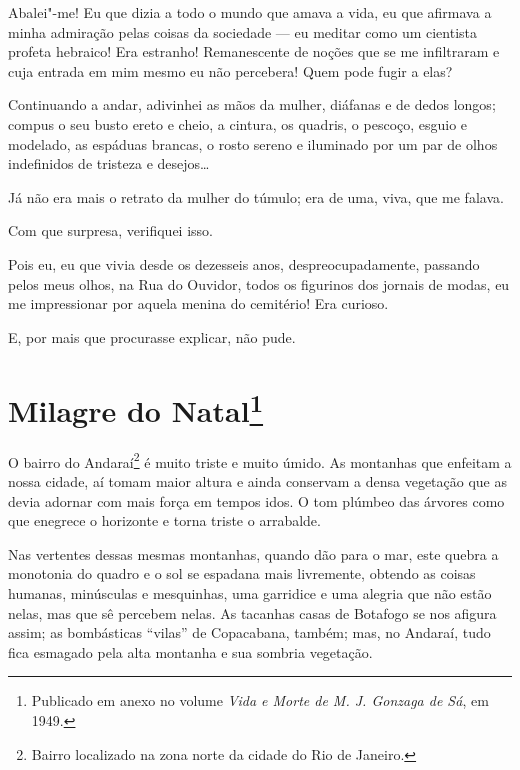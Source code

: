 Abalei"-me! Eu que dizia a todo o mundo que amava a vida, eu que afirmava
a minha admiração pelas coisas da sociedade --- eu meditar como um
cientista profeta hebraico! Era estranho! Remanescente de noções que se
me infiltraram e cuja entrada em mim mesmo eu não percebera! Quem pode
fugir a elas?

Continuando a andar, adivinhei as mãos da mulher, diáfanas e de dedos
longos; compus o seu busto ereto e cheio, a cintura, os quadris, o
pescoço, esguio e modelado, as espáduas brancas, o rosto sereno e
iluminado por um par de olhos indefinidos de tristeza e desejos\ldots{}

Já não era mais o retrato da mulher do túmulo; era de uma, viva, que me
falava.

Com que surpresa, verifiquei isso.

Pois eu, eu que vivia desde os dezesseis anos, despreocupadamente,
passando pelos meus olhos, na Rua do Ouvidor, todos os figurinos dos
jornais de modas, eu me impressionar por aquela menina do cemitério! Era
curioso.

E, por mais que procurasse explicar, não pude.



\chapter[Milagre do Natal]{Milagre do Natal\footnote[*]{Publicado em anexo no volume \emph{Vida e Morte de M. J. Gonzaga de Sá}, em 1949.}}

O bairro do Andaraí\footnote{Bairro localizado na zona norte da cidade
  do Rio de Janeiro.} é muito triste e muito úmido. As montanhas que
enfeitam a nossa cidade, aí tomam maior altura e ainda conservam a densa
vegetação que as devia adornar com mais força em tempos idos. O tom
plúmbeo das árvores como que enegrece o horizonte e torna triste o
arrabalde.

Nas vertentes dessas mesmas montanhas, quando dão para o mar, este
quebra a monotonia do quadro e o sol se espadana mais livremente,
obtendo as coisas humanas, minúsculas e mesquinhas, uma garridice e uma
alegria que não estão nelas, mas que sê percebem nelas. As tacanhas
casas de Botafogo se nos afigura assim; as bombásticas ``vilas'' de
Copacabana, também; mas, no Andaraí, tudo fica esmagado pela alta
montanha e sua sombria vegetação.

